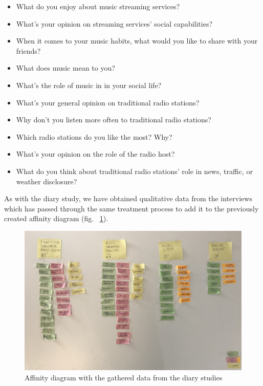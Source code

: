 \begin{itemize}
  \item What do you enjoy about music streaming services?
  \item What’s your opinion on streaming services’ social capabilities?
  \item When it comes to your music habits, what would you like to share with your friends?
  \item What does music mean to you?
  \item What’s the role of music in in your social life?
  \item What’s your general opinion on traditional radio stations?
  \item Why don’t you listen more often to traditional radio stations?
  \item Which radio stations do you like the most? Why?
  \item What’s your opinion on the role of the radio host?
  \item What do you think about traditional radio stations’ role in news, traffic, or weather disclosure?
\end{itemize}

As with the diary study, we have obtained qualitative data from the interviews which has passed through the same treatment process to add it to the previously created affinity diagram (fig. ~\ref{fig:diagram1}). 

\begin{figure}[!h]
    \centering
    \includegraphics[width=\columnwidth]{./Images/affinitydiagram.jpg}
    \caption{Affinity diagram with the gathered data from the diary studies}
    \label{fig:diagram1}
\end{figure}

